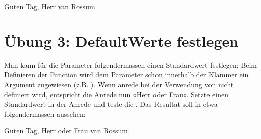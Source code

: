 \documentclass[letterpaper,10pt,english]{sphinxmanual}
\begin{document}
\begin{sphinxVerbatim}[commandchars=\\\{\}]
\end{sphinxVerbatim}

\begin{sphinxVerbatim}[commandchars=\\\{\}]
\PYGZsq{}Guten Tag, Herr van Rossum\PYGZsq{}
\end{sphinxVerbatim}


\section{Übung 3: Default\sphinxhyphen{}Werte festlegen}
\label{\detokenize{02_03_Functions:ubung-3-default-werte-festlegen}}
Man kann für die Parameter folgendermassen einen Standardwert festlegen: Beim Definieren der Function wird dem Parameter schon innerhalb der Klammer ein Argument zugewiesen (z.B. ). Wenn anrede bei der Verwendung von  nicht definiert wird, entspricht die Anrede nun «Herr oder Frau». Setzte einen Standardwert in der Anrede und teste die . Das Resultat soll in etwa folgendermassen aussehen:

\begin{sphinxVerbatim}[commandchars=\\\{\}]
    
\end{sphinxVerbatim}

\begin{sphinxVerbatim}[commandchars=\\\{\}]
\end{sphinxVerbatim}

\begin{sphinxVerbatim}[commandchars=\\\{\}]
\PYGZsq{}Guten Tag, Herr oder Frau van Rossum\PYGZsq{}
\end{sphinxVerbatim}
\end{document}
